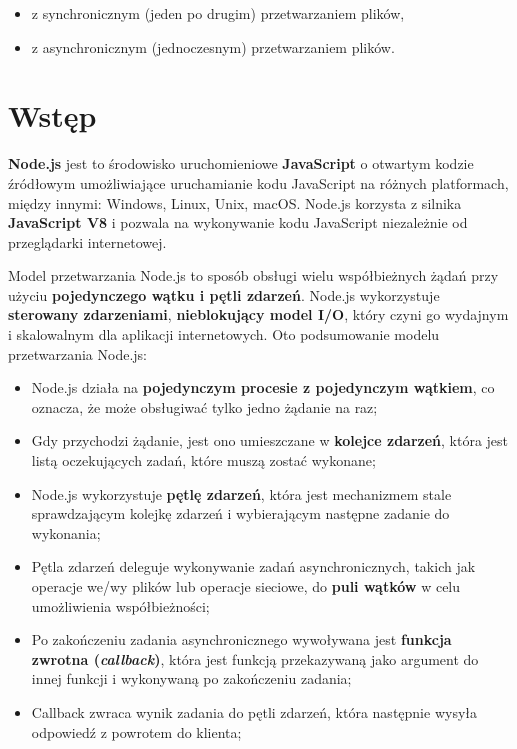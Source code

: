\documentclass[11pt]{article}
\providecommand{\tightlist}{%
      \setlength{\itemsep}{0pt}\setlength{\parskip}{0pt}}
\begin{document}
\begin{itemize}
\tightlist
\item
  z synchronicznym (jeden po drugim) przetwarzaniem plików,
\item
  z asynchronicznym (jednoczesnym) przetwarzaniem plików.
\end{itemize}

    \hypertarget{wstux119p}{%
\section{Wstęp}\label{wstux119p}}

\textbf{Node.js} jest to środowisko uruchomieniowe \textbf{JavaScript} o
otwartym kodzie źródłowym umożliwiające uruchamianie kodu JavaScript na
różnych platformach, między innymi: Windows, Linux, Unix, macOS. Node.js
korzysta z silnika \textbf{JavaScript V8} i pozwala na wykonywanie kodu
JavaScript niezależnie od przeglądarki internetowej.

Model przetwarzania Node.js to sposób obsługi wielu współbieżnych żądań
przy użyciu \textbf{pojedynczego wątku i pętli zdarzeń}. Node.js
wykorzystuje \textbf{sterowany zdarzeniami}, \textbf{nieblokujący model
I/O}, który czyni go wydajnym i skalowalnym dla aplikacji internetowych.
Oto podsumowanie modelu przetwarzania Node.js:

\begin{itemize}
\tightlist
\item
  Node.js działa na \textbf{pojedynczym procesie z pojedynczym wątkiem},
  co oznacza, że może obsługiwać tylko jedno żądanie na raz;
\item
  Gdy przychodzi żądanie, jest ono umieszczane w \textbf{kolejce
  zdarzeń}, która jest listą oczekujących zadań, które muszą zostać
  wykonane;
\item
  Node.js wykorzystuje \textbf{pętlę zdarzeń}, która jest mechanizmem
  stale sprawdzającym kolejkę zdarzeń i wybierającym następne zadanie do
  wykonania;
\item
  Pętla zdarzeń deleguje wykonywanie zadań asynchronicznych, takich jak
  operacje we/wy plików lub operacje sieciowe, do \textbf{puli wątków} w
  celu umożliwienia współbieżności;
\item
  Po zakończeniu zadania asynchronicznego wywoływana jest
  \textbf{funkcja zwrotna (\emph{callback})}, która jest funkcją
  przekazywaną jako argument do innej funkcji i wykonywaną po
  zakończeniu zadania;
\item
  Callback zwraca wynik zadania do pętli zdarzeń, która następnie wysyła
  odpowiedź z powrotem do klienta;
\end{itemize}
\end{document}
